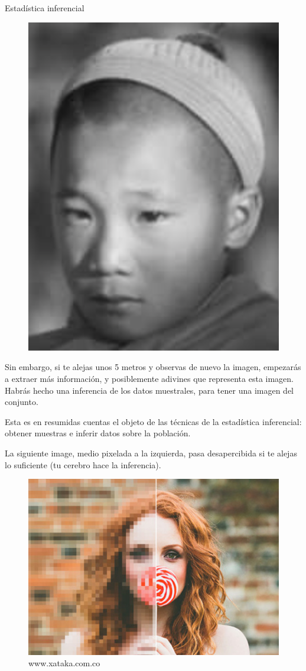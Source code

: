 \begin{myexampleblock}{Estadística inferencial}
\begin{multicols}{2}
\begin{figure}[H]
	\centering
	\includegraphics[width=.3\textwidth]{imagenes/imagenes05/T05IM06.png}
	\end{figure}
\end{multicols}

\vspace{2mm} Sin embargo, si te alejas unos 5 metros y observas de nuevo la imagen, empezarás a extraer más información, y posiblemente adivines que representa esta imagen. Habrás hecho una inferencia de los datos muestrales, para tener una imagen del conjunto. 


	
\vspace{2mm} Esta es en resumidas cuentas el objeto de las técnicas de la estadística inferencial: obtener muestras e inferir datos sobre la población. 

\vspace{2mm} La siguiente image, medio pixelada a la izquierda, pasa desapercibida si te alejas lo suficiente (tu cerebro hace la inferencia).
	
\begin{figure}[H]
	\centering
	\includegraphics[width=.5\textwidth]{imagenes/imagenes05/T05IM07.png}
	\caption*{\footnotesize{www.xataka.com.co}}
	\end{figure}
\end{myexampleblock}


\vspace{2cm}



